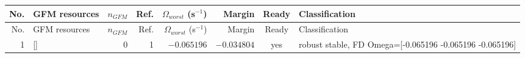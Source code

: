\begingroup\footnotesize\setlength{\tabcolsep}{2pt}
\begin{longtable}{@{}r p{} r r r r c p{}@{}}
\toprule
No. & GFM resources & $n_{GFM}$ & Ref. & $\Omega_{worst}$ (s$^{-1}$) & Margin & Ready & Classification \\ \midrule
\endfirsthead
\toprule
No. & GFM resources & $n_{GFM}$ & Ref. & $\Omega_{worst}$ (s$^{-1}$) & Margin & Ready & Classification \\ \midrule
\endhead
1 & {[}{]} & 0 & 1 & $-0.065196$ & $-0.034804$ & yes & robust stable, FD Omega={[}-0.065196 -0.065196 -0.065196{]} \\ 
\bottomrule
\end{longtable}\endgroup
